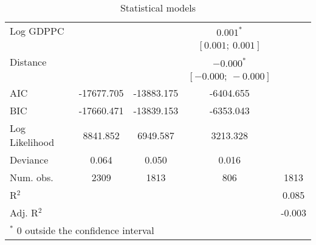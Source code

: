 \begin{table}[H]
\begin{center}
\begin{tabular}{l c c c c }
Log GDPPC      &                   &                     & $0.001^{*}$         &                     \\
               &                   &                     & $[0.001;\ 0.001]$   &                     \\
Distance       &                   &                     & $-0.000^{*}$        &                     \\
               &                   &                     & $[-0.000;\ -0.000]$ &                     \\
\hline
AIC            & -17677.705        & -13883.175          & -6404.655           &                     \\
BIC            & -17660.471        & -13839.153          & -6353.043           &                     \\
Log Likelihood & 8841.852          & 6949.587            & 3213.328            &                     \\
Deviance       & 0.064             & 0.050               & 0.016               &                     \\
Num. obs.      & 2309              & 1813                & 806                 & 1813                \\
R$^2$          &                   &                     &                     & 0.085               \\
Adj. R$^2$     &                   &                     &                     & -0.003              \\
\hline
\multicolumn{5}{l}{\scriptsize{$^*$ 0 outside the confidence interval}}
\end{tabular}
\caption{Statistical models}
\label{table:coefficients}
\end{center}
\end{table}

